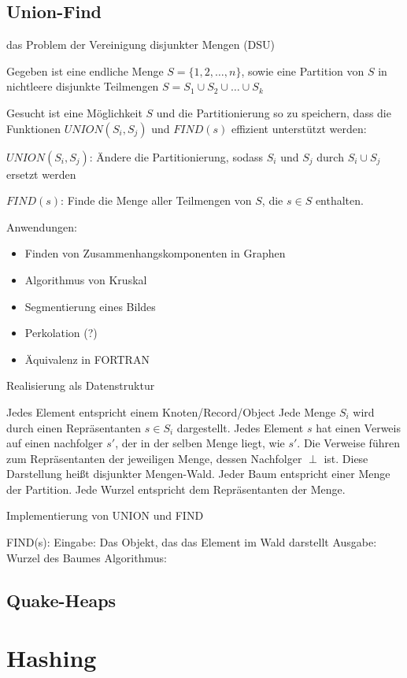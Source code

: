 \subsection{Union-Find}

das Problem der Vereinigung disjunkter Mengen (DSU)

Gegeben ist eine endliche Menge $S = \{1, 2, \ldots, n\}$, sowie eine Partition
von $S$ in nichtleere disjunkte Teilmengen
$S = S_1 \cup S_2 \cup \ldots \cup S_k$

Gesucht ist eine Möglichkeit $S$ und die Partitionierung so zu speichern, dass
die Funktionen $UNION(S_i, S_j)$ und $FIND(s)$ effizient unterstützt werden:

$UNION(S_i, S_j)$: Ändere die Partitionierung, sodass $S_i$ und $S_j$ durch
$S_i \cup S_j$ ersetzt werden

$FIND(s)$: Finde die Menge aller Teilmengen von $S$, die $s \in S$ enthalten.

Anwendungen:
\begin{itemize}
\item Finden von Zusammenhangskomponenten in Graphen
\item Algorithmus von Kruskal
\item Segmentierung eines Bildes
\item Perkolation (?)
\item Äquivalenz in FORTRAN
\end{itemize}

Realisierung als Datenstruktur

Jedes Element entspricht einem Knoten/Record/Object
Jede Menge $S_i$ wird durch einen Repräsentanten $s \in S_i$ dargestellt.
Jedes Element $s$ hat einen Verweis auf einen nachfolger $s'$, der in der selben
Menge liegt, wie $s'$. Die Verweise führen zum Repräsentanten der jeweiligen
Menge, dessen Nachfolger $\perp$ ist.
Diese Darstellung heißt disjunkter Mengen-Wald. Jeder Baum entspricht einer
Menge der Partition. Jede Wurzel entspricht dem Repräsentanten der Menge.

Implementierung von UNION und FIND

FIND(s): Eingabe: Das Objekt, das das Element im Wald darstellt
Ausgabe: Wurzel des Baumes
Algorithmus: 


\subsection{Quake-Heaps}


\section{Hashing}

